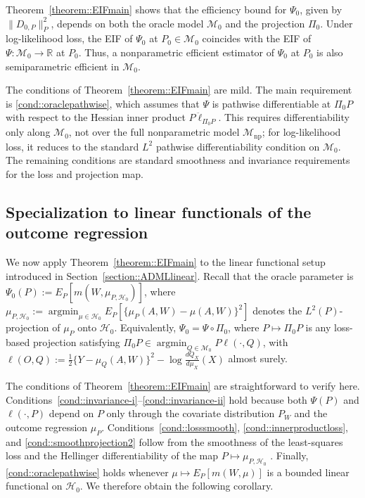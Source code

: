 \documentclass[11pt]{article}
\DeclareMathOperator*{\argmin}{argmin}
\theoremstyle{definition}
\begin{document}
Theorem~\ref{theorem::EIFmain} shows that the efficiency bound for \(\Psi_0\), given by \(\|D_{0,P}\|_{P}^2\), depends on both the oracle model \(\mathcal{M}_0\) and the projection \(\Pi_0\). Under log-likelihood loss, the EIF of \(\Psi_0\) at \(P_0 \in \mathcal{M}_0\) coincides with the EIF of \(\Psi:\mathcal{M}_0 \to \mathbb{R}\) at \(P_0\). Thus, a nonparametric efficient estimator of \(\Psi_0\) at \(P_0\) is also semiparametric efficient in \(\mathcal{M}_0\).




The conditions of Theorem~\ref{theorem::EIFmain} are mild. The main requirement is \ref{cond::oraclepathwise}, which assumes that \(\Psi\) is pathwise differentiable at \(\Pi_0 P\) with respect to the Hessian inner product \(P\ddot{\ell}_{\Pi_0 P}\). This requires differentiability only along \(\mathcal{M}_0\), not over the full nonparametric model \(\mathcal{M}_{\mathrm{np}}\); for log-likelihood loss, it reduces to the standard \(L^2\) pathwise differentiability condition on \(\mathcal{M}_0\). The remaining conditions are standard smoothness and invariance requirements for the loss and projection map.

 


 
\subsection{Specialization to linear functionals of the outcome regression}
\label{section::EIFlinear}

We now apply Theorem~\ref{theorem::EIFmain} to the linear functional setup introduced in Section~\ref{section::ADMLlinear}. Recall that the oracle parameter is \(\Psi_0(P) := E_P[m(W, \mu_{P,\mathcal{H}_0})]\), where \(\mu_{P,\mathcal{H}_0} := \argmin_{\mu \in \mathcal{H}_0} E_P[\{\mu_P(A,W) - \mu(A,W)\}^2]\) denotes the \(L^2(P)\)-projection of \(\mu_P\) onto \(\mathcal{H}_0\). Equivalently, \(\Psi_0 = \Psi \circ \Pi_0\), where \(P \mapsto \Pi_0 P\) is any loss-based projection satisfying \(\Pi_0 P \in \argmin_{Q \in \mathcal{M}_0} P\ell(\cdot,Q)\), with \(\ell(O,Q) := \frac{1}{2}\{Y - \mu_Q(A,W)\}^2 - \log \frac{dQ_X}{d\mu_X}(X)\) almost surely.

The conditions of Theorem~\ref{theorem::EIFmain} are straightforward to verify here. Conditions~\ref{cond::invariance-i}--\ref{cond::invariance-ii} hold because both \(\Psi(P)\) and \(\ell(\cdot,P)\) depend on \(P\) only through the covariate distribution \(P_W\) and the outcome regression \(\mu_P\). Conditions~\ref{cond::losssmooth}, \ref{cond::innerproductloss}, and \ref{cond::smoothprojection2} follow from the smoothness of the least-squares loss and the Hellinger differentiability of the map \(P \mapsto \mu_{P,\mathcal{H}_0}\) \citep{luedtke2024one}. Finally, \ref{cond::oraclepathwise} holds whenever \(\mu \mapsto E_P[m(W,\mu)]\) is a bounded linear functional on \(\mathcal{H}_0\). We therefore obtain the following corollary.
\end{document}

